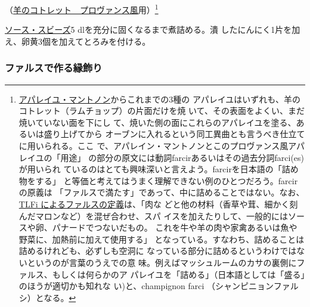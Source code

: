 \begin{recette}


（\protect\hyperlink{cotelettes-provencale}{羊のコトレット　プロヴァンス風}用）\footnote{\protect\hyperlink{appareil-maintenon}{アパレイユ・マントノン}からこれまでの3種の
  アパレイユはいずれも、羊のコトレット（ラムチョップ）の片面だけを焼
  いて、その表面をよくい、まだ焼いていない面を下にし
  て、焼いた側の面にこれらのアパレイユを塗る、あるいは盛り上げてから
  オーブンに入れるという同工異曲とも言うべき仕立てに用いられる。ここ
  で、アパレイン・マントノンとこのプロヴァンス風アパレイユの「用途」
  の部分の原文には動詞farcirあるいはその過去分詞farci(es)が用いられ
  ているのはとても興味深いと言えよう。farcirを日本語の「詰め物をする」
  と等価と考えてはうまく理解できない例のひとつだろう。farcirの原義は
  「ファルスで満たす」であって、中に詰めることではない。なお、\href{http://cnrtl.fr/definition/farce}{TLFi
  によるファルスの定義}は、「肉な
  どと他の材料（香草や茸、細かく刻んだマロンなど）を混ぜ合わせ、スパ
  イスを加えたりして、一般的にはソースや卵、パナードでつないだもの。
  これを牛や羊の肉や家禽あるいは魚や野菜に、加熱前に加えて使用する」
  となっている。すなわち、詰めることは詰めるけれども、必ずしも空洞に
  なっている部分に詰めるというわけではないというのが言葉のうえでの意
  味。例えばマッシュルームのカサの裏側にファルス、もしくは何らかのア
  パレイユを「詰める」（日本語としては「盛る」のほうが適切かも知れな
  い)と、champignon farci （シャンピニョンファルシ）となる。}

\protect\hyperlink{sauce-soubise}{ソース・スビーズ}5
dlを充分に固くなるまで煮詰める。潰
したにんにく1片を加え、卵黄3個を加えてとろみを付ける。

\maeaki

\hypertarget{bordures-en-farce}{%
\subsubsection{ファルスで作る縁飾り}\label{bordures-en-farce}}




\end{recette}

